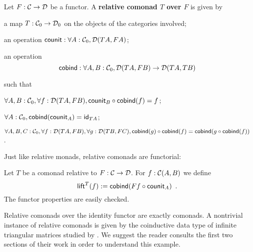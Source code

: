 \documentclass[conference,10pt]{IEEEtran}
\newcommand{\fat}[1]{\textbf{#1}}
\begin{document}
\begin{definition}\label{def:rel_comonad}
  Let $F:\C\to\D$ be a functor. A \fat{relative comonad $T$ over $F$} is given by
  \begin{packitem}
   \item a map $T:\C_0 \to \D_0$ on the objects of the categories involved;
   \item an operation $\counit : \forall A : \C_0, \D(TA,FA)$;
   \item an operation \[\cobind: \forall A,B:\C_0, \D(TA,FB) \to \D(TA,TB)\]
  \end{packitem}
  such that 
  \begin{packitem}
   \item $\forall A,B:\C_0, \forall f:\D(TA,FB), \comp{\cobind(f)}{\counit_B} = f$;
   \item $\forall A : \C_0, \cobind(\counit_A) = \id_{TA}$;
   \item $\forall A,B,C:\C_0, \forall f : \D(TA,FB),\forall g:\D(TB,FC), \\
        \comp{\cobind(f)}{\cobind(g)} = \cobind(\comp{\cobind(f)}{g})$.
  \end{packitem} 
\end{definition}
Just like relative monads, relative comonads are functorial:
\begin{definition}\label{def:lift}
 Let $T$ be a  comonad relative to $F:\C\to\D$.
 For $f : \C(A,B)$ we define
  \[ \lift^T(f) := \cobind(\comp{\counit_A}{Ff}) \enspace .  \]
 The functor properties are easily checked.
\end{definition}
Relative comonads over the identity functor are exactly comonads.
A nontrivial instance of relative comonads is given by the coinductive data type of infinite triangular matrices
studied by \textcite{DBLP:conf/types/MatthesP11}. We suggest the reader consults the first two sections of their work
in order to understand this example.
\end{document}
